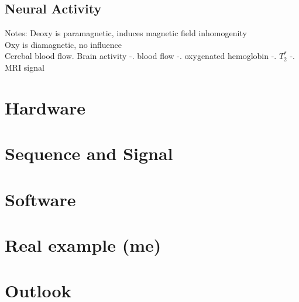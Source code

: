\documentclass[a4paper]{scrartcl}
\begin{document}
\subsection{Neural Activity}


Notes:
Deoxy is paramagnetic, induces magnetic field inhomogenity \\
Oxy is diamagnetic, no influence \\
Cerebal blood flow. Brain activity -. blood flow -. oxygenated hemoglobin -. $T_2^*$ -. MRI signal

\section{Hardware}
\label{sec:hardware}

\section{Sequence and Signal}
\label{sec:sequenceSignal}

\section{Software}
\label{sec:software}

\section{Real example (me)}
\label{sec:example}

\section{Outlook}
\label{sec:outlook}

\printbibliography
\end{document}
